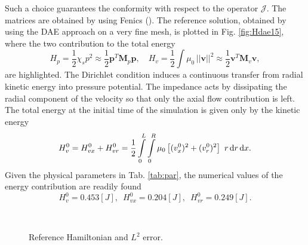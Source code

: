 \documentclass{ifacconf}
\begin{document}
Such a choice guarantees the conformity with respect to the operator $\mathcal{J}$. The matrices are obtained by using Fenics (\cite{LoggMardalEtAl2012}). 
The reference solution, obtained by using the DAE approach on a very fine mesh, is plotted in Fig. \ref{fig:Hdae15}, where the two contribution to the total energy
\[
H_p = \frac{1}{2} \chi_s p^2  \approx \frac{1}{2} \mathbf{p}^T \mathbf{M}_p \mathbf{p}, \quad H_v = \frac{1}{2} \int \mu_0 \, ||\mathbf{v}||^2 \approx \frac{1}{2} \mathbf{v}^T \mathbf{M}_v \mathbf{v}, \]
are highlighted. The Dirichlet condition induces a continuous transfer from radial kinetic energy into pressure potential. The impedance acts by dissipating the radial component of the velocity so that only the axial flow contribution is left. The total energy at the initial time of the simulation is given only by the kinetic energy
\[
H_v^0 = H_{vx}^0 + H_{vr}^0 = \frac{1}{2} \int_{0}^L\int_{0}^R  \mu_0 \left[(v_x^0)^2 + (v_r^0)^2 \right] \ r \d{r}\d{x}.
\]
Given the physical parameters in Tab. \ref{tab:par}, the numerical values of the energy contribution are readily found
\[H_v^0 = 0.453 [J], \ \; H_{vx}^0 = 0.204 [J], \ \; H_{vr}^0 = 0.249 [J].\]

\begin{figure}[ht]%
	\centering
	\hspace{8pt}%
	 \\
	\caption[]{Reference Hamiltonian and $L^2$ error.}%
	\label{fig:Href_err}%
\end{figure}
\end{document}
